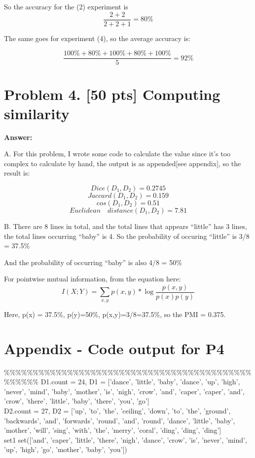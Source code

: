\documentclass{article}
\begin{document}
So the accuracy for the (2) experiment is $$\frac{2+2}{2+2+1} = 80\%$$

The same goes for experiment (4), so the average accuracy is:

$$\frac{100\% + 80\% + 100\% + 80\% + 100\%}{5} = 92\%$$


\section{Problem 4. [50 pts] Computing similarity}

\textbf{Answer:}

A. For this problem, I wrote some code to calculate the value since it's too complex to calculate by hand, the output is as appended[see appendix], so the result is:

$$Dice(D_1, D_2) = 0.2745$$
$$Jaccard(D_1, D_2) = 0.159$$
$$cos(D_1, D_2) = 0.51$$
$$Euclidean \quad distance(D_1, D_2) = 7.81$$

B. There are 8 lines in total, and the total lines that appears ``little'' has 3 lines, the total lines occurring ``baby'' is 4. So the probability of occuring ``little'' is 3/8 = 37.5\%

And the probability of occurring ``baby'' is also 4/8 = 50\%

For pointwise mutual information, from the equation here:
$$I(X;Y) = \sum_{x,y}{p(x,y) * \log{\frac{p(x,y)}{p(x)p(y)}}}$$

Here, p(x) = 37.5\%, p(y)=50\%, p(x,y)=3/8=37.5\%, so the PMI = 0.375. 

\section{Appendix - Code output for P4}
\%\%\%\%\%\%\%\%\%\%\%\%\%\%\%\%\%\%\%\%\%\%\%\%\%\%\%\%\%\%\%\%\%\%\%\%\%\%\%\%\%\%\%\%\%\%\%\%\%
D1.count = 24, D1 = ['dance', 'little', 'baby', 'dance', 'up', 'high', 'never', 'mind', 'baby', 'mother', 'is', 'nigh', 'crow', 'and', 'caper', 'caper', 'and', 'crow', 'there', 'little', 'baby', 'there', 'you', 'go'] \\

D2.count = 27, D2 = ['up', 'to', 'the', 'ceiling', 'down', 'to', 'the', 'ground', 'backwards', 'and', 'forwards', 'round', 'and', 'round', 'dance', 'little', 'baby', 'mother', 'will', 'sing', 'with', 'the', 'merry', 'coral', 'ding', 'ding', 'ding'] \\

set1 set(['and', 'caper', 'little', 'there', 'nigh', 'dance', 'crow', 'is', 'never', 'mind', 'up', 'high', 'go', 'mother', 'baby', 'you']) \\
\end{document}
